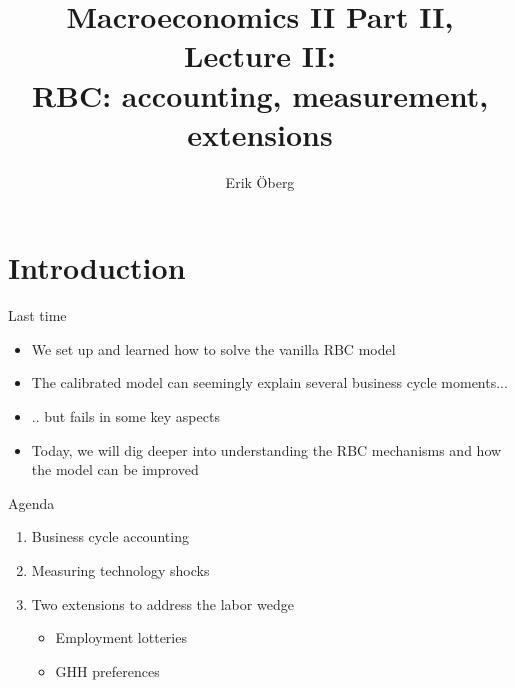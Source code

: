 \documentclass[9pt,xcolor={dvipsnames}]{beamer}
\title[RBC accounting, measurement, extensions]{Macroeconomics II Part II, Lecture II:\\
	  RBC: accounting, measurement, extensions}
\author{Erik {\"O}berg}
\date{}
\newcommand{\bit}{\begin{itemize}}
\newcommand{\eit}{\end{itemize}}
\newcommand{\ben}{\begin{enumerate}}
\newcommand{\een}{\end{enumerate}}
\begin{document}
\begin{frame}
\maketitle
\end{frame}

\section{Introduction}

\begin{frame}{Last time}

\bit
\setlength\itemsep{1.5em} 

\item We set up and learned how to solve the vanilla RBC model

\item The calibrated model can seemingly explain several business cycle moments...

\item .. but fails in some key aspects

\item Today, we will dig deeper into understanding the RBC mechanisms and how the model can be improved

\eit

\end{frame}


\begin{frame}{Agenda}

\ben
\setlength\itemsep{1.5em} 

\item Business cycle accounting

\item Measuring technology shocks

\item Two extensions to address the labor wedge
\bit
\setlength\itemsep{0.5em} 

	\item Employment lotteries
	
	\item GHH preferences
	
\eit

\een

\end{frame}
\end{document}
